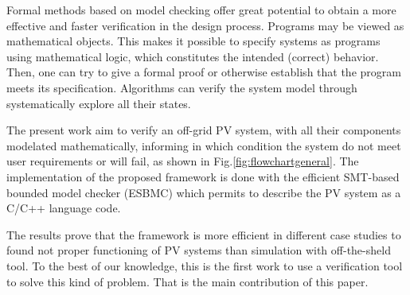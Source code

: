 \documentclass[journal]{IEEEtran}
\begin{document}
Formal methods based on model checking offer great potential to obtain a more effective and faster verification in the design process. Programs may be viewed as mathematical objects. 
 This makes it possible to specify systems as programs using mathematical logic, which constitutes the intended (correct) behavior. Then, one can try to give a formal proof or otherwise establish that the program meets its specification.%
%
%
Algorithms can verify the system model through systematically explore all their states. 

The present work aim to verify an off-grid PV system, with all their components modelated mathematically, informing in which condition the system do not meet user requirements or will fail, as shown in Fig.\ref{fig:flowchartgeneral}. 
The implementation of the
proposed framework is done with the efficient SMT-based bounded model checker (ESBMC) %
 which permits to describe the PV system as a C/C++ language code.
  
The results prove that the framework is more efficient in different case studies to found not proper functioning of PV systems than simulation with off-the-sheld tool. To the best of our knowledge, this is the first work to use a
verification tool to solve this kind of problem. That is the main contribution of this paper.
\end{document}
